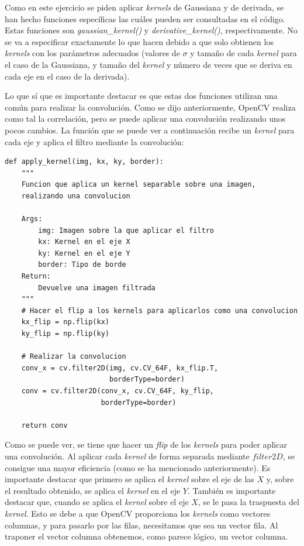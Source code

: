 \documentclass[11pt,a4paper]{article}
\begin{document}
Como en este ejercicio se piden aplicar \textit{kernels} de Gaussiana y de derivada, se han hecho funciones específicas
las cuáles pueden ser consultadas en el código. Estas funciones son \textit{gaussian\_kernel()} y \textit{derivative\_kernel()},
respectivamente. No se va a especificar exactamente lo que hacen debido a que solo obtienen los \textit{kernels} con los
parámetros adecuados (valores de $\sigma$ y tamaño de cada \textit{kernel} para el caso de la Gaussiana, y tamaño del
\textit{kernel} y número de veces que se deriva en cada eje en el caso de la derivada).

Lo que sí que es importante destacar es que estas dos funciones utilizan una común para realizar la convolución. Como se
dijo anteriormente, OpenCV realiza como tal la correlación, pero se puede aplicar una convolución realizando unos pocos cambios.
La función que se puede ver a continuación recibe un \textit{kernel} para cada eje y aplica el filtro mediante la
convolución:

\begin{lstlisting}[caption={Función que aplica un filtro separable.},label={alg:apply-kernel}]
def apply_kernel(img, kx, ky, border):
    """
    Funcion que aplica un kernel separable sobre una imagen,
    realizando una convolucion

    Args:
        img: Imagen sobre la que aplicar el filtro
        kx: Kernel en el eje X
        ky: Kernel en el eje Y
        border: Tipo de borde
    Return:
        Devuelve una imagen filtrada
    """
    # Hacer el flip a los kernels para aplicarlos como una convolucion
    kx_flip = np.flip(kx)
    ky_flip = np.flip(ky)

    # Realizar la convolucion
    conv_x = cv.filter2D(img, cv.CV_64F, kx_flip.T,
    					 borderType=border)
    conv = cv.filter2D(conv_x, cv.CV_64F, ky_flip,
    				   borderType=border)

    return conv
\end{lstlisting}

Como se puede ver, se tiene que hacer un \textit{flip} de los \textit{kernels} para poder aplicar una convolución.
Al aplicar cada \textit{kernel} de forma separada mediante $filter2D$, se consigue una mayor eficiencia (como se ha
mencionado anteriormente). Es importante destacar que primero se aplica el \textit{kernel} sobre el eje de las $X$ y,
sobre el resultado obtenido, se aplica el \textit{kernel} en el eje $Y$. También es importante destacar que, cuando
se aplica el \textit{kernel} sobre el eje $X$, se le pasa la traspuesta del \textit{kernel}. Esto se debe a que
OpenCV proporciona los \textit{kernels} como vectores columnas, y para pasarlo por las filas, necesitamos que sea
un vector fila. Al traponer el vector columna obtenemos, como parece lógico, un vector columna.
\end{document}
